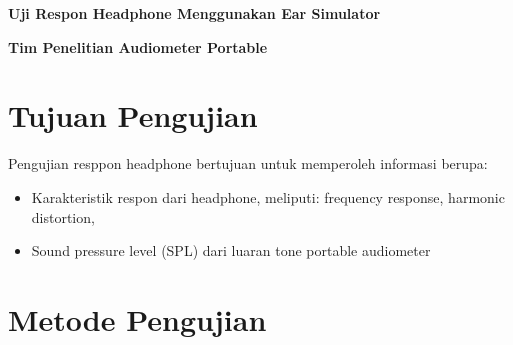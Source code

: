 \documentclass{article}
\begin{document}
	\begin{titlepage}
		\centering
		
		{
			\LARGE
			\bf
			Uji Respon Headphone Menggunakan Ear Simulator
		}
		
		\bigskip
		
		{
			\large
			\bf
			Tim Penelitian Audiometer Portable  
		}
		
		\vfill
	\end{titlepage}
	
	\newpage
	
	
	\section{Tujuan Pengujian}
	Pengujian resppon headphone bertujuan untuk memperoleh informasi berupa:
	\begin{itemize}
		\item Karakteristik respon dari headphone, meliputi: frequency response, harmonic distortion, 
		\item Sound pressure level (SPL) dari luaran tone portable audiometer
	\end{itemize}
	
	\section{Metode Pengujian}
\end{document}
